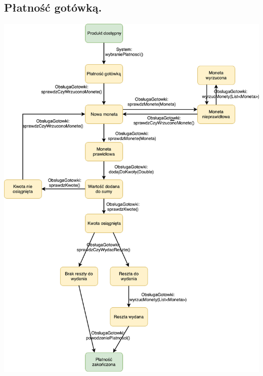 \documentclass[11pt]{article}
\begin{document}
		\subsection{Płatność gotówką.}
		\begin{center}
			\includegraphics[scale=0.7]{stanu3.pdf}
		\end{center}
		\newpage
\end{document}
